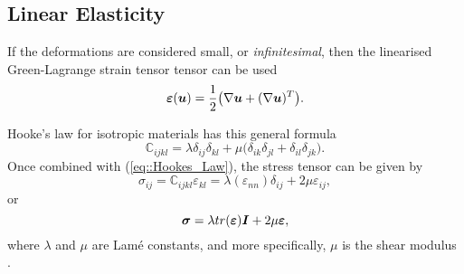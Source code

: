 \subsection{Linear Elasticity}
If the deformations are considered small, or \textit{infinitesimal}, then the linearised Green-Lagrange strain tensor tensor can be used
\begin{equation}
  \bm{\varepsilon}(\bm{u}) = \frac{1}{2}\big(\nabla\bm{u} + (\nabla\bm{u})^T\big).
\end{equation}

Hooke's law for isotropic materials has this general formula
\begin{equation}
  \mathbb{C}_{ijkl} = \lambda\delta_{ij}\delta_{kl} + \mu\big(\delta_{ik}\delta_{jl} + \delta_{il}\delta_{jk}\big).
\end{equation}
Once combined with (\ref{eq::Hookes_Law}), the stress tensor can be given by
\begin{equation}
  \sigma_{ij} = \mathbb{C}_{ijkl}\varepsilon_{kl} = \lambda(\varepsilon_{nn})\delta_{ij} + 2\mu\varepsilon_{ij},
\end{equation}
or
\begin{equation}
  \bm{\sigma} = \lambda tr(\bm{\varepsilon})\bm{I} + 2\mu\bm{\varepsilon},
\end{equation}
where $\lambda$ and $\mu$ are Lam\'{e} constants, and more specifically, $\mu$ is the shear modulus \cite{landau86}.
